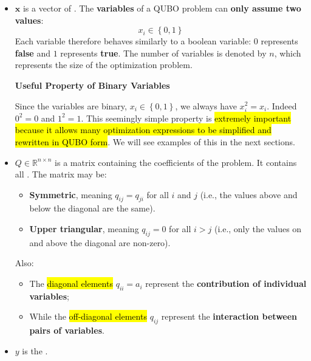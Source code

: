 \begin{itemize}
    \item $\mathbf{x}$ is a vector of . The \textbf{variables} of a QUBO problem can \textbf{only assume two values}:
    \begin{equation*}
        x_{i} \in \left\{0, 1\right\}
    \end{equation*}
    Each variable therefore behaves similarly to a boolean variable: $0$ represents \textbf{false} and $1$ represents \textbf{true}. The number of variables is denoted by $n$, which represents the size of the optimization problem.

    \begin{flushleft}
        \textcolor{Green3}{ \textbf{Useful Property of Binary Variables}}
    \end{flushleft}
    Since the variables are binary, $x_{i} \in \left\{0, 1\right\}$, we always have $x_{i}^{2} = x_{i}$. Indeed $0^{2} = 0$ and $1^{2} = 1$. This seemingly simple property is \hl{extremely important because it allows many optimization expressions to be simplified and rewritten in QUBO form}. We will see examples of this in the next sections.
    

    \item $Q \in \mathbb{R}^{n \times n}$ is a matrix containing the coefficients of the problem. It contains all . The matrix may be:
    \begin{itemize}
        \item \textbf{Symmetric}, meaning $q_{ij} = q_{ji}$ for all $i$ and $j$ (i.e., the values above and below the diagonal are the same).
        \item \textbf{Upper triangular}, meaning $q_{ij} = 0$ for all $i > j$ (i.e., only the values on and above the diagonal are non-zero).
    \end{itemize}
    Also:
    \begin{itemize}
        \item The \hl{diagonal elements} $q_{ii} = a_{i}$ represent the \textbf{contribution of individual variables};
        \item While the \hl{off-diagonal elements} $q_{ij}$ represent the \textbf{interaction between pairs of variables}.
    \end{itemize}
    

    \item $y$ is the .
\end{itemize}

